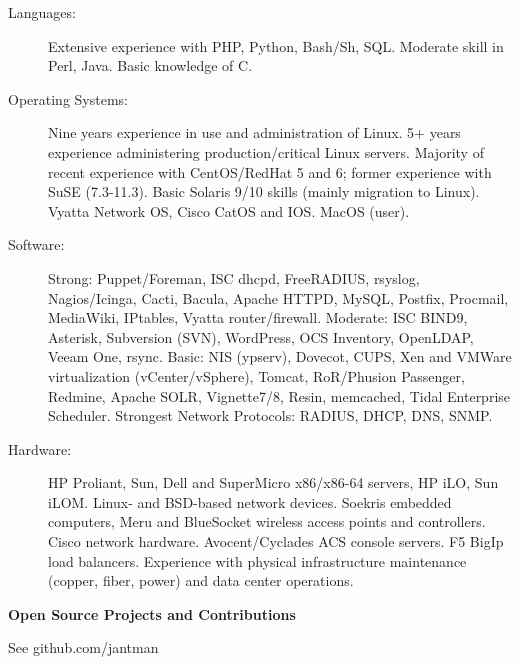 \documentclass[letterpaper,11pt]{article}
\newcommand{\resheading}[1]{{\large \colorbox{mygrey}{\begin{minipage}{\textwidth}{\textbf{#1 \vphantom{p\^{E}}}}\end{minipage}}}}
\begin{document}
\begin{description}
\item[Languages:]
Extensive experience with PHP, Python, Bash/Sh, SQL. Moderate skill in Perl, Java. Basic knowledge of C.
\item[Operating Systems:]
Nine years experience in use and administration of Linux. 5+ years experience administering production/critical Linux servers.
Majority of recent experience with CentOS/RedHat 5 and 6; former experience with SuSE
(7.3-11.3). Basic Solaris 9/10 skills (mainly migration to Linux). Vyatta Network OS, Cisco CatOS and IOS. MacOS (user).
\item[Software:]
Strong: Puppet/Foreman, ISC dhcpd, FreeRADIUS, rsyslog, Nagios/Icinga, Cacti, Bacula, Apache HTTPD, MySQL, Postfix, Procmail, MediaWiki, IPtables, Vyatta router/firewall. Moderate: ISC BIND9, Asterisk, Subversion (SVN), WordPress, OCS Inventory, OpenLDAP, Veeam One, rsync. Basic: NIS (ypserv), Dovecot, CUPS, Xen and VMWare virtualization (vCenter/vSphere), Tomcat, RoR/Phusion Passenger, Redmine, Apache SOLR, Vignette7/8, Resin, memcached, Tidal Enterprise Scheduler. Strongest Network Protocols: RADIUS, DHCP, DNS, SNMP.


\item[Hardware:]
HP Proliant, Sun, Dell and SuperMicro x86/x86-64 servers, HP iLO, Sun iLOM. Linux- and
BSD-based network devices. Soekris embedded computers, Meru and BlueSocket
wireless access points and controllers. Cisco network hardware. Avocent/Cyclades ACS console servers. F5 BigIp load balancers. Experience with physical infrastructure maintenance (copper, fiber, power) and data center operations.
\end{description}

\resheading{Open Source Projects and Contributions}
\begin{description}
\item{See github.com/jantman}
\end{description}
\end{document}
